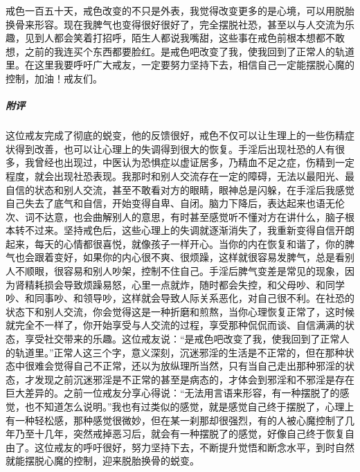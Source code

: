 \begin{case}
    戒色一百五十天，戒色改变的不只是外表，我觉得改变更多的是心境，可以用脱胎换骨来形容。现在我脾气也变得很好很好了，完全摆脱社恐，甚至以与人交流为乐趣，见到人都会笑着打招呼，陌生人都说我嘴甜，这些事在戒色前根本想都不敢想，之前的我连买个东西都要脸红。是戒色吧改变了我，使我回到了正常人的轨道里。在这里我要呼吁广大戒友，一定要努力坚持下去，相信自己一定能摆脱心魔的控制，加油！戒友们。
    \subparagraph{附评} 这位戒友完成了彻底的蜕变，他的反馈很好，戒色不仅可以让生理上的一些伤精症状得到改善，也可以让心理上的失调得到很大的恢复。手淫后出现社恐的人有很多，我曾经也出现过，中医认为恐惧症以虚证居多，乃精血不足之症，伤精到一定程度，就会出现社恐表现。我那时和别人交流存在一定的障碍，无法以最阳光、最自信的状态和别人交流，甚至不敢看对方的眼睛，眼神总是闪躲，在手淫后我感觉自己失去了底气和自信，开始变得自卑、自闭。脑力下降后，表达起来也语无伦次、词不达意，也会曲解别人的意思，有时甚至感觉听不懂对方在讲什么，脑子根本转不过来。坚持戒色后，这些心理上的失调就逐渐消失了，我重新变得自信开朗起来，每天的心情都很喜悦，就像孩子一样开心。当你的内在恢复和谐了，你的脾气也会跟着变好，如果你的内心很不爽、很烦躁，这样就很容易发脾气，总是看别人不顺眼，很容易和别人吵架，控制不住自己。手淫后脾气变差是常见的现象，因为肾精耗损会导致烦躁易怒，心里一点就炸，随时都会失控，和父母吵、和同学吵、和同事吵、和领导吵，这样就会导致人际关系恶化，对自己很不利。在社恐的状态下和别人交流，你会觉得这是一种折磨和煎熬，当你心理恢复正常了，这时候就完全不一样了，你开始享受与人交流的过程，享受那种侃侃而谈、自信满满的状态，享受社交带来的乐趣。这位戒友说：“是戒色吧改变了我，使我回到了正常人的轨道里。”正常人这三个字，意义深刻，沉迷邪淫的生活是不正常的，但在那种状态中很难会觉得自己不正常，还以为放纵理所当然，只有当自己走出那种邪淫的状态，才发现之前沉迷邪淫是不正常的甚至是病态的，才体会到邪淫和不邪淫是存在巨大差异的。之前一位戒友分享心得说：“无法用言语来形容，有一种摆脱了的感觉，也不知道怎么说明。”我也有过类似的感觉，就是感觉自己终于摆脱了，心理上有一种轻松感，那种感觉很微妙，但在某一刹那却很强烈，有的人被心魔控制了几年乃至十几年，突然戒掉恶习后，就会有一种摆脱了的感觉，好像自己终于恢复自由了。这位戒友的呼吁很好，努力坚持下去，不断提升觉悟和断念水平，到时自然就能摆脱心魔的控制，迎来脱胎换骨的蜕变。
\end{case}

